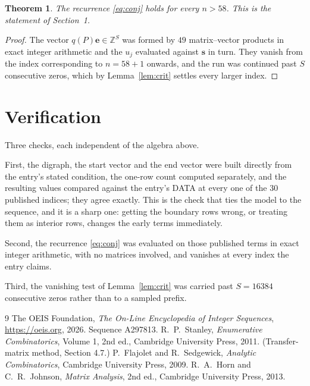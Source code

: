 \documentclass[11pt,a4paper]{article}
\theoremstyle{plain}
\newtheorem{theorem}{Theorem}
\theoremstyle{definition}
\begin{document}
\begin{theorem}
The recurrence \eqref{eq:conj} holds for every $n>58$. This is the statement of
Section~1.
\end{theorem}

\begin{proof}
The vector $q(P)\mathbf{e}\in\mathbb{Z}^{S}$ was formed by $49$ matrix--vector
products in exact integer arithmetic and the $u_j$ evaluated against $\mathbf{s}$ in turn.
They vanish from the index corresponding to $n=58+1$ onwards, and the run was continued
past $S$ consecutive zeros, which by Lemma~\ref{lem:crit} settles every larger index.
\end{proof}

\section{Verification}

Three checks, each independent of the algebra above.

First, the digraph, the start vector and the end vector were built directly from the
entry's stated condition, the one-row count computed separately, and the resulting values
compared against the entry's DATA at every one of the $30$ published indices; they
agree exactly. This is the check that ties the model to the sequence, and it is a sharp one:
getting the boundary rows wrong, or treating them as interior rows, changes the early terms
immediately.

Second, the recurrence \eqref{eq:conj} was evaluated on those published terms in exact
integer arithmetic, with no matrices involved, and vanishes at every index the entry claims.

Third, the vanishing test of Lemma~\ref{lem:crit} was carried past $S=16384$ consecutive
zeros rather than to a sampled prefix.

\begin{thebibliography}{9}
 The OEIS Foundation, \emph{The On-Line Encyclopedia of Integer
Sequences}, \url{https://oeis.org}, 2026. Sequence A297813.
 R.~P.~Stanley, \emph{Enumerative Combinatorics}, Volume 1, 2nd ed.,
Cambridge University Press, 2011. (Transfer-matrix method, Section 4.7.)
 P.~Flajolet and R.~Sedgewick, \emph{Analytic Combinatorics}, Cambridge
University Press, 2009.
 R.~A.~Horn and C.~R.~Johnson, \emph{Matrix Analysis}, 2nd ed., Cambridge
University Press, 2013.
\end{thebibliography}
\end{document}
